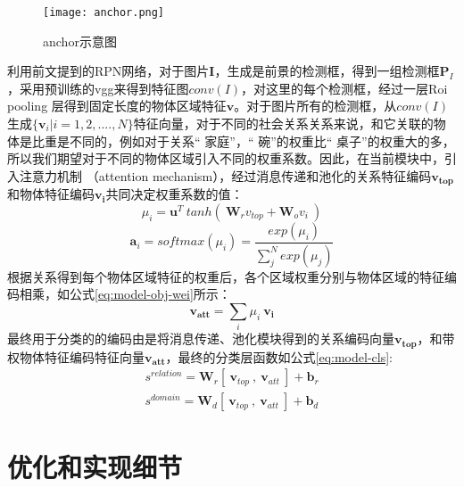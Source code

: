 \begin{figure}[htpb]
	\centering
	\texttt{[image: anchor.png]}
    \caption{anchor示意图}
	\vspace*{-3.5mm}
	\label{fig:anchor}
\end{figure}

利用前文提到的RPN网络，对于图片$\bm{I}$，生成是前景的检测框，得到一组检测框$\bm{P}_{I}$，采用预训练的vgg来得到特征图$conv(I)$，对这里的每个检测框，经过一层Roi pooling 层得到固定长度的物体区域特征$\mathbf{v}$。对于图片所有的检测框，从$conv(I)$生成$\{ \mathbf{v}_{i}|i=1,2,....,N\}$特征向量，对于不同的社会关系关系来说，和它关联的物体是比重是不同的，例如对于关系`` 家庭''，`` 碗''的权重比`` 桌子''的权重大的多，所以我们期望对于不同的物体区域引入不同的权重系数。因此，在当前模块中，引入注意力机制
（attention mechanism），经过消息传递和池化的关系特征编码$\mathbf{v_{top}}$和物体特征编码$\mathbf{v_{i}}$共同决定权重系数的值：
\begin{equation}
    \mu_{i} = \mathbf{u}^{T}~tanh(~\mathbf{W}_{r}v_{top}+\mathbf{W}_{o}v_{i}~)
\end{equation}
\begin{equation}
    \mathbf{a}_{i} = softmax(\mu_i) = \frac{exp(\mu_{i})}{\sum_{j}^{N}exp(\mu_{j})}
\end{equation}
根据关系得到每个物体区域特征的权重后，各个区域权重分别与物体区域的特征编码相乘，如公式\ref{eq:model-obj-wei}所示：
\begin{equation}
    \label{eq:model-obj-wei}
    \mathbf{v_{att}} = \sum_{i}\mu_{i}~\mathbf{v_{i}}
\end{equation}
最终用于分类的的编码由是将消息传递、池化模块得到的关系编码向量$\mathbf{v_{top}}$，和带权物体特征编码特征向量$\mathbf{v_{att}}$，最终的分类层函数如公式\ref{eq:model-cls}:
\begin{equation}
    \label{eq:model-cls}
    \begin{split}
    s^{relation} = \mathbf{W}_{r}[~\mathbf{v}_{top}~,~\mathbf{v}_{att}~] + \mathbf{b}_r \\
    s^{domain} = \mathbf{W}_{d}[~\mathbf{v}_{top}~,~\mathbf{v}_{att}~] + \mathbf{b}_d
    \end{split}
\end{equation}

\section{优化和实现细节}

